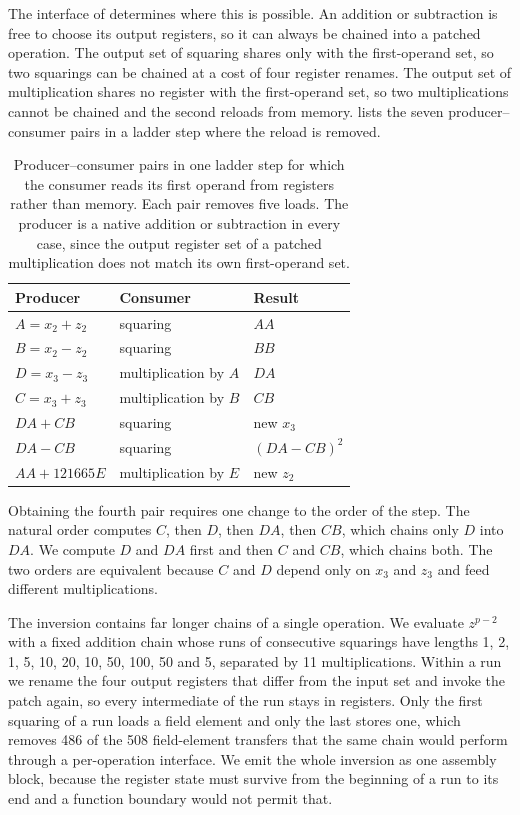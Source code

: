The interface of  determines where this is possible.
An addition or subtraction is free to choose its output registers, so it can always
be chained into a patched operation.
The output set of squaring shares only  with the first-operand set, so two
squarings can be chained at a cost of four register renames.
The output set of multiplication shares no register with the first-operand set, so
two multiplications cannot be chained and the second reloads from memory.
 lists the seven producer--consumer pairs in a ladder step
where the reload is removed.

\begin{table}[htbp]
\centering
\caption{Producer--consumer pairs in one ladder step for which the consumer reads
its first operand from registers rather than memory. Each pair removes five loads.
The producer is a native addition or subtraction in every case, since the output
register set of a patched multiplication does not match its own first-operand set.}
\label{tab:c25519-chains}
\footnotesize
\setlength{\tabcolsep}{6pt}
\begin{tabular}{@{}lll@{}}
\toprule
Producer & Consumer & Result \\
\midrule
$A=x_2+z_2$          & squaring          & $AA$      \\
$B=x_2-z_2$          & squaring          & $BB$      \\
$D=x_3-z_3$          & multiplication by $A$ & $DA$  \\
$C=x_3+z_3$          & multiplication by $B$ & $CB$  \\
$DA+CB$              & squaring          & new $x_3$ \\
$DA-CB$              & squaring          & $(DA-CB)^2$ \\
$AA+121665E$         & multiplication by $E$ & new $z_2$ \\
\bottomrule
\end{tabular}
\end{table}

Obtaining the fourth pair requires one change to the order of the step.
The natural order computes $C$, then $D$, then $DA$, then $CB$, which chains only
$D$ into $DA$.
We compute $D$ and $DA$ first and then $C$ and $CB$, which chains both.
The two orders are equivalent because $C$ and $D$ depend only on $x_3$ and $z_3$ and
feed different multiplications.

The inversion contains far longer chains of a single operation.
We evaluate $z^{p-2}$ with a fixed addition chain whose runs of consecutive
squarings have lengths 1, 2, 1, 5, 10, 20, 10, 50, 100, 50 and 5, separated by 11
multiplications.
Within a run we rename the four output registers that differ from the input set and
invoke the patch again, so every intermediate of the run stays in registers.
Only the first squaring of a run loads a field element and only the last stores one,
which removes 486 of the 508 field-element transfers that the same chain would perform
through a per-operation interface.
We emit the whole inversion as one assembly block, because the register state must
survive from the beginning of a run to its end and a function boundary would not
permit that.

